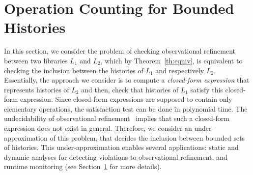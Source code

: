 \section{Operation Counting for Bounded Histories}

In this section, we consider the problem of checking observational refinement between two libraries $L_1$ and $L_2$, 
which by Theorem~\ref{th:equiv}, is equivalent to checking the inclusion between the histories of $L_1$ and respectively $L_2$.
Essentially, the approach we consider is to compute a \emph{closed-form expression} that represents histories of $L_2$
and then, check that histories of $L_1$ satisfy this closed-form expression. 
Since closed-form expressions are supposed to contain only elementary operations, the satisfaction test can be done in 
polynomial time.
The undecidability of observational 
refinement~\cite{conf/esop/BouajjaniEEH13} implies that such a closed-form expression does not exist in general.
Therefore, we consider an under-approximation of this problem, that decides the inclusion between bounded
sets of histories. This under-approximation enables several applications: static and dynamic analyses for
detecting violations to observational refinement, and runtime monitoring (see Section~\ref{} for more details).

%


